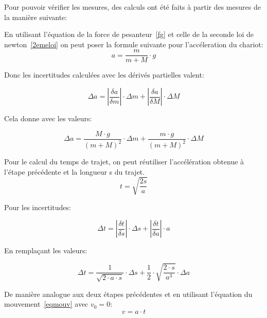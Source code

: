 Pour pouvoir vérifier les mesures, des calculs ont été faits à partir des mesures de la manière suivante:

En utilisant l'équation de la force de pesanteur~\eqref{fg} et celle de la seconde loi de newton~\eqref{2emeloi} on peut poser la formule suivante pour l'accéleration du chariot:
\begin{equation}
    a = \frac{m}{m + M} \cdot g
\end{equation}

Donc les incertitudes calculées avec les dérivés partielles valent:

\begin{equation}
    \Delta a = |\frac{\delta a}{\delta m}| \cdot \Delta m + |\frac{\delta a}{\delta M}| \cdot \Delta M
\end{equation}

Cela donne avec les valeurs:

\begin{equation}
    \Delta a = \frac{M \cdot g}{(m+M)^2} \cdot \Delta m + \frac{m \cdot g}{(m+M)^2} \cdot \Delta M
\end{equation}


Pour le calcul du temps de trajet, on peut réutiliser l'accélération obtenue à l'étape précédente et la longueur s du trajet.
\begin{equation}
    t = \sqrt{\frac{2s}{a}}
\end{equation}

Pour les incertitudes:

\begin{equation}
    \Delta t = |\frac{\delta t}{\delta s}| \cdot \Delta s + |\frac{\delta t}{\delta a}| \cdot a
\end{equation}

En remplaçant les valeurs:

\begin{equation}
    \Delta t = \frac{1}{\sqrt{2\cdot a \cdot s}}\cdot \Delta s + \frac{1}{2} \cdot \sqrt{\frac{2\cdot s}{a^3}}\cdot \Delta a
\end{equation}

De manière analogue aux deux étapes précédentes et en utilisant l'équation du mouvement~\eqref{eqmouv} avec $v_0=0$:
\begin{equation}
    v=a\cdot t
\end{equation}

